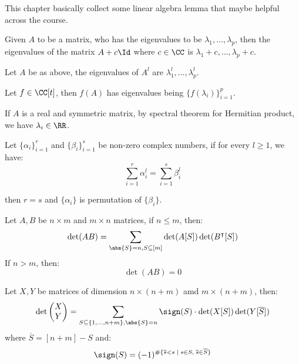 \newpage

This chapter basically collect some linear algebra lemma that maybe helpful across the course.

\begin{lemma}
	Given \( A \) to be a matrix, who has the eigenvalues to be \( \lambda_1, \ldots, \lambda_p \), then the eigenvalues of the matrix \( A+c\Id \) where \( c \in \CC \) is \( \lambda_1 + c, \ldots, \lambda_p+c \).
\end{lemma}

\begin{lemma}
	\label{lem:nilpotent}
	Let \( A \) be as above, the eigenvalues of \( A^l \) are \( \lambda_1^l, \ldots, \lambda_p^l \).
\end{lemma}

\begin{lemma}
	\label{lem:poly-eigen}
	Let \( f \in \CC[t] \), then \( f(A) \) has eigenvalues being \( \{f(\lambda_i)\}_{i=1}^p \).
\end{lemma}

\begin{lemma}
	If \( A \) is a real and symmetric matrix, by spectral theorem for Hermitian product, we have \( \lambda_i \in \RR \).
\end{lemma}

\begin{lemma}
	\label{lem:match}
	Let \( \{\alpha_i\}_{i=1}^r \) and \( \{\beta_i\}_{i=1}^s \) be non-zero complex numbers, if for every \( l \geq 1 \), we have:
	\[
		\sum_{i=1}^{r}\alpha_i^l = \sum_{i=1}^s \beta_i^l
	\]

	then \( r=s \) and \(\{\alpha_i\} \) is permutation of \( \{\beta_i\} \).
\end{lemma}

\begin{theorem}
	\label{thm:cauchy-binet}
	Let \( A, B \) be \( n\times m \) and \( m\times n \) matrices, if \( n\leq m \), then:
	\[
		\det(AB) = \sum_{\abs{S} = n, S \subseteq [m]} \det(A[S]) \det(B^\intercal [S])
	\]
	If \( n> m \), then:
	\[
		\det(AB) = 0
	\]
\end{theorem}

\begin{theorem}
	\label{thm:laplacian-expansion}
	Let \( X, Y \) be matrices of dimension \( n\times (n+m) \) amd \( m\times (n+m) \), then:
	\[
		\det \begin{pmatrix}
			X \\
			Y
		\end{pmatrix} = \sum_{S \subseteq \{1,\ldots, n+m\}, \abs{S} = n} \sign(S) \cdot \det(X[S]) \det(Y[\overline{S}])
	\]
	where \( \overline{S} = [n+m]-S \) and:
	\[
		\sign(S) = (-1)^{\# \{\overline{s} < s \; | \; s\in S, \; \overline{s} \in \overline{S}\}}
	\]
\end{theorem}


